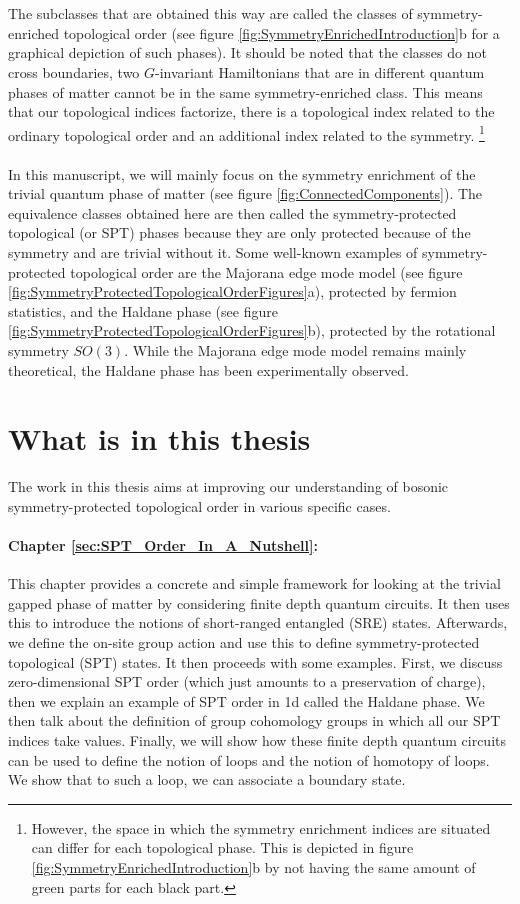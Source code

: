 \\\\
The subclasses that are obtained this way are called the classes of symmetry-enriched topological order (see figure \ref{fig:SymmetryEnrichedIntroduction}b for a graphical depiction of such phases). It should be noted that the classes do not cross boundaries, two $G$-invariant Hamiltonians that are in different quantum phases of matter cannot be in the same symmetry-enriched class. This means that our topological indices factorize, there is a topological index related to the ordinary topological order and an additional index related to the symmetry. \footnote{However, the space in which the symmetry enrichment indices are situated can differ for each topological phase. This is depicted in figure \ref{fig:SymmetryEnrichedIntroduction}b by not having the same amount of green parts for each black part.}
\\\\
In this manuscript, we will mainly focus on the symmetry enrichment of the trivial quantum phase of matter (see figure \ref{fig:ConnectedComponents}). The equivalence classes obtained here are then called the symmetry-protected topological (or SPT) phases because they are only protected because of the symmetry and are trivial without it. Some well-known examples of symmetry-protected topological order are the Majorana edge mode model (see figure \ref{fig:SymmetryProtectedTopologicalOrderFigures}a), protected by fermion statistics, and the Haldane phase (see figure \ref{fig:SymmetryProtectedTopologicalOrderFigures}b), protected by the rotational symmetry $SO(3)$. While the Majorana edge mode model remains mainly theoretical, the Haldane phase has been experimentally\cite{sompet2022realizing} observed.

\section{What is in this thesis}
The work in this thesis aims at improving our understanding of bosonic symmetry-protected topological order in various specific cases.
\paragraph{Chapter \ref{sec:SPT_Order_In_A_Nutshell}:}This chapter provides a concrete and simple framework for looking at the trivial gapped phase of matter by considering finite depth quantum circuits. It then uses this to introduce the notions of short-ranged entangled (SRE) states. Afterwards, we define the on-site group action and use this to define symmetry-protected topological (SPT) states. It then proceeds with some examples. First, we discuss zero-dimensional SPT order (which just amounts to a preservation of charge), then we explain an example of SPT order in 1d called the Haldane phase. We then talk about the definition of group cohomology groups in which all our SPT indices take values. Finally, we will show how these finite depth quantum circuits can be used to define the notion of loops and the notion of homotopy of loops. We show that to such a loop, we can associate a boundary state.
